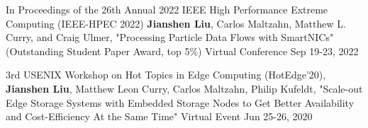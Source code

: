 

\begin{cventries}

  \cventry
    {In Proceedings of the 26th Annual 2022 IEEE High Performance Extreme Computing (IEEE-HPEC 2022)} %
    {\textbf{Jianshen Liu}, Carlos Maltzahn, Matthew L. Curry, and Craig Ulmer, "Processing Particle Data Flows with SmartNICs" (Outstanding Student Paper Award, top 5\%)} %
    {Virtual Conference} %
    {Sep 19-23, 2022} %
    {}

  \cventry
    {3rd USENIX Workshop on Hot Topics in Edge Computing (HotEdge'20),} %
    {\textbf{Jianshen Liu}, Matthew Leon Curry, Carlos Maltzahn, Philip Kufeldt, "Scale-out Edge Storage Systems with Embedded Storage Nodes to Get Better Availability and Cost-Efficiency At the Same Time"} %
    {Virtual Event} %
    {Jun 25-26, 2020} %
    {}

\end{cventries}
